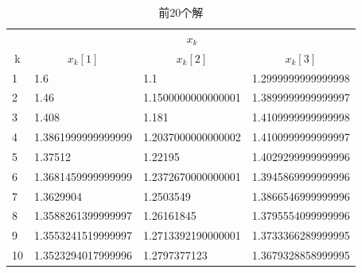 \begin{table}[H]

    \centering
    \caption[]{前20个解}
    \label{tab:x}
    \begin{tabular}{llll}
    \hline
                                       & \multicolumn{3}{c}{ $x_k$}                                                                                                         \\
    \multicolumn{1}{c}{ k} & \multicolumn{1}{c}{ $x_k[1]$} & \multicolumn{1}{c}{ $x_k[2]$} & \multicolumn{1}{c}{ $x_k[3]$} \\ \hline
     1                     & 1.6                                      & 1.1                                         & 1.2999999999999998                       \\
     2                     & 1.46                                     & 1.1500000000000001                          & 1.3899999999999997                       \\
     3                     & 1.408                                    & 1.181                                       & 1.4109999999999998                       \\
     4                     & 1.3861999999999999                       & 1.2037000000000002                          & 1.4100999999999997                       \\
     5                     & 1.37512                                  & 1.22195                                     & 1.4029299999999996                       \\
     6                     & 1.3681459999999999                       & 1.2372670000000001                          & 1.3945869999999996                       \\
     7                     & 1.3629904                                & 1.2503549                                   & 1.3866546999999996                       \\
     8                     & 1.3588261399999997                       & 1.26161845                                  & 1.3795554099999996                       \\
     9                     & 1.3553241519999997                       & 1.2713392190000001                          & 1.3733366289999995                       \\
     10                    & 1.3523294017999996                       & 1.2797377123                                & 1.3679328858999995                       \\

\end{tabular}
\end{table}
